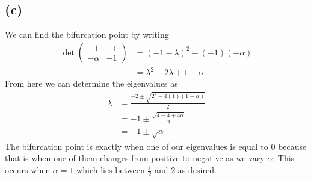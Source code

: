 \documentclass{article}
\theoremstyle{definition}
\begin{document}
    \subsection*{(c)}
    We can find the bifurcation point by writing
    \begin{align*}
        \det\begin{pmatrix}
            -1 & -1 \\
            - \alpha & -1
        \end{pmatrix} &= (-1 - \lambda)^2 - (-1)(-\alpha) \\
        &= \lambda^2 + 2\lambda + 1 - \alpha
    \end{align*}
    From here we can determine the eigenvalues as
    \begin{align*}
        \lambda &= \frac{-2 \pm \sqrt{2^2 - 4(1)(1-\alpha)}}{2} \\
        &= -1 \pm \frac{\sqrt{4 - 4 + 4\alpha}}{2} \\
        &= -1 \pm \sqrt{\alpha}
    \end{align*}
    The bifurcation point is exactly when one of our eigenvalues is equal to 0 because that is when one of them changes from 
    positive to negative as we vary $\alpha$. This occurs when $\alpha = 1$ which lies between $\frac{1}{2}$ and $2$ as desired.
\end{document}
